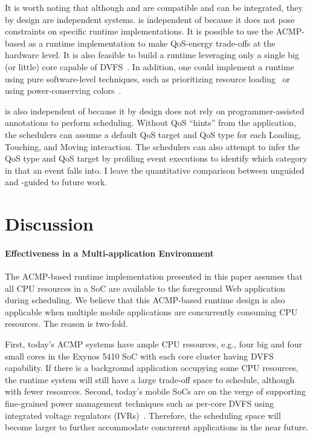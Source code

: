 It is worth noting that although \greenweb and \webrt are compatible and can be integrated, they by design are independent systems. \greenweb is independent of \webrt because it does not pose constraints on specific runtime implementations. It is possible to use the ACMP-based \webrt as a \greenweb runtime implementation to make QoS-energy trade-offs at the hardware level. It is also feasible to build a runtime leveraging only a single big (or little) core capable of DVFS~\cite{pgdvfs,vsmp}. In addition, one could implement a \greenweb runtime using pure software-level techniques, such as prioritizing resource loading~\cite{klotski} or using power-conserving colors~\cite{chameleon}. 

\webrt is also independent of \greenweb because it by design does not rely on programmer-assisted annotations to perform scheduling. Without QoS ``hints'' from the application, the \webrt schedulers can assume a default QoS target and QoS type for each Loading, Touching, and Moving interaction. The \webrt schedulers can also attempt to infer the QoS type and QoS target by profiling event executions to identify which category in  that an event falls into. I leave the quantitative comparison between unguided and \greenweb-guided \webrt to future work.

\section{Discussion}
\label{sec:lang:disc}

\paragraph{Effectiveness in a Multi-application Environment} The ACMP-based \greenweb runtime implementation presented in this paper assumes that all CPU resources in a SoC are available to the foreground Web application during scheduling. We believe that this ACMP-based runtime design is also applicable when multiple mobile applications are concurrently consuming CPU resources. The reason is two-fold.

First, today's ACMP systems have ample CPU resources, e.g., four big and four small cores in the Exynos 5410 SoC with each core cluster having DVFS capability. If there is a background application occupying some CPU resources, the \greenweb runtime system will still have a large trade-off space to schedule, although with fewer resources. Second, today's mobile SoCs are on the verge of supporting fine-grained power management techniques such as per-core DVFS using integrated voltage regulators (IVRs)~\cite{ivr}. Therefore, the scheduling space will become larger to further accommodate concurrent applications in the near future.

